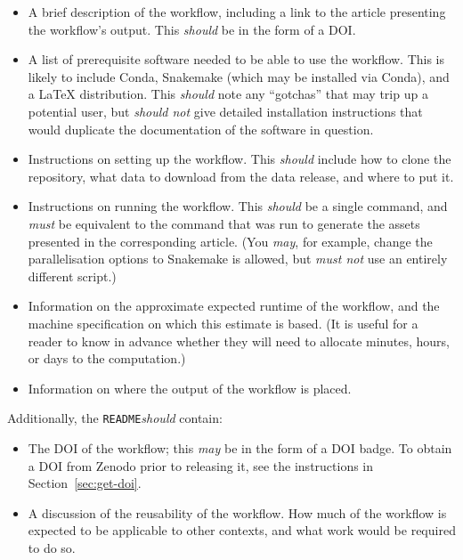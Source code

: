 \documentclass{article}
\newcommand\rfcword[1]{\emph{#1}\xspace}
\newcommand\must{\rfcword{must}}
\newcommand\mustnot{\rfcword{must not}}
\newcommand\should{\rfcword{should}}
\newcommand\shouldnot{\rfcword{should not}}
\newcommand\may{\rfcword{may}}
\newcommand\filename[1]{\texttt{#1}\xspace}
\newcommand\readme{\filename{README}\xspace}
\begin{document}
\begin{itemize}
  \item
        A brief description of the workflow,
        including a link to the article presenting the workflow's output.
        This \should be in the form of a DOI\@.
  \item
        A list of prerequisite software needed to be able to use the workflow.
        This is likely to include
        Conda,
        Snakemake
        (which may be installed via Conda),
        and a LaTeX distribution.
        This \should note any ``gotchas'' that may trip up a potential user,
        but \shouldnot give detailed installation instructions
        that would duplicate the documentation of the software in question.
  \item
        Instructions on setting up the workflow.
        This \should include how to clone the repository,
        what data to download from the data release,
        and where to put it.
  \item
        Instructions on running the workflow.
        This \should be a single command,
        and \must be equivalent to the command that was run
        to generate the assets presented in the corresponding article.
        (You \may,
        for example,
        change the parallelisation options to Snakemake is allowed,
        but \mustnot use an entirely different script.)
  \item
        Information on the approximate expected runtime of the workflow,
        and the machine specification on which this estimate is based.
        (It is useful for a reader to know in advance
        whether they will need to allocate
        minutes,
        hours,
        or days
        to the computation.)
  \item
        Information on where the output of the workflow is placed.
\end{itemize}

Additionally,
the \readme \should contain:

\begin{itemize}
  \item
        The DOI of the workflow;
        this \may be in the form of a DOI badge.
        To obtain a DOI from Zenodo prior to releasing it,
        see the instructions in Section~\ref{sec:get-doi}.
  \item
        A discussion of the reusability of the workflow.
        How much of the workflow is expected to be applicable to other contexts,
        and what work would be required to do so.
\end{itemize}
\end{document}
